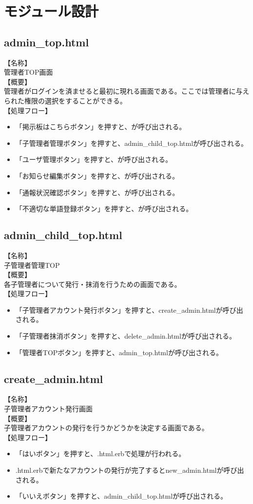 \documentclass[a4j]{jarticle}
\begin{document}
\section{モジュール設計}
\subsection{admin\_top.html}
\noindent
【名称】\\
管理者TOP画面\\
【概要】\\
管理者がログインを済ませると最初に現れる画面である。ここでは管理者に与えられた権限の選択をすることができる。\\
【処理フロー】
\begin{itemize}
\item 「掲示板はこちらボタン」を押すと、が呼び出される。
\item 「子管理者管理ボタン」を押すと、admin\_child\_top.htmlが呼び出される。
\item 「ユーザ管理ボタン」を押すと、が呼び出される。
\item 「お知らせ編集ボタン」を押すと、が呼び出される。
\item 「通報状況確認ボタン」を押すと、が呼び出される。
\item 「不適切な単語登録ボタン」を押すと、が呼び出される。
\end{itemize}

\subsection{admin\_child\_top.html}
\noindent
【名称】\\
子管理者管理TOP\\
【概要】\\
各子管理者について発行・抹消を行うための画面である。\\
【処理フロー】
\begin{itemize}
\item 「子管理者アカウント発行ボタン」を押すと、create\_admin.htmlが呼び出される。
\item 「子管理者抹消ボタン」を押すと、delete\_admin.htmlが呼び出される。
\item 「管理者TOPボタン」を押すと、admin\_top.htmlが呼び出される。
\end{itemize}

\subsection{create\_admin.html}
\noindent
【名称】\\
子管理者アカウント発行画面\\
【概要】\\
子管理者アカウントの発行を行うかどうかを決定する画面である。\\
【処理フロー】
\begin{itemize}
\item 「はいボタン」を押すと、.html.erbで処理が行われる。
\item .html.erbで新たなアカウントの発行が完了するとnew\_admin.htmlが呼び出される。
\item 「いいえボタン」を押すと、admin\_child\_top.htmlが呼び出される。
\end{itemize}
\end{document}
